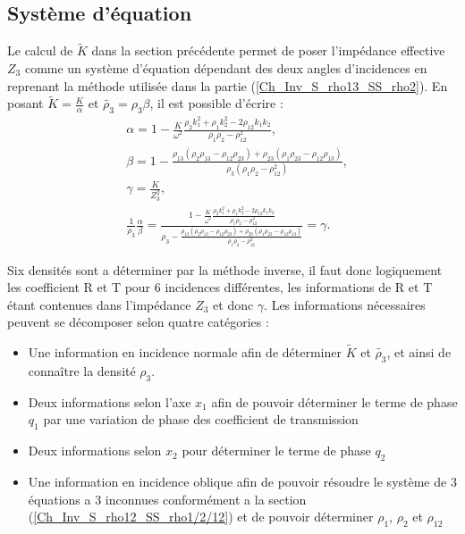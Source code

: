 \documentclass[12pt]{report}
\begin{document}
\subsection{Système d'équation}
	Le calcul de $\tilde{K}$ dans la section précédente permet de poser l'impédance effective $Z_3$ comme un système d'équation dépendant des deux angles d'incidences en reprenant la méthode utilisée dans la partie (\ref{Ch_Inv_S_rho13_SS_rho2}). En posant $\tilde{K}=\frac{K}{\alpha}$ et $\tilde{\rho_3}=\rho_3 \beta$, il est possible d'écrire :
    \begin{align}
    &\alpha=1-\frac{K}{\omega^2}\frac{\rho_2 k_1^2+\rho_1 k_2^2-2\rho_{12}k_1k_2}{\rho_1\rho_2-\rho_{12}^2},\nonumber \\
    &\beta=1-\frac{\rho_{13}(\rho_2\rho_{13}-\rho_{12}\rho_{23})+\rho_{23}(\rho_1\rho_{23}-\rho_{12}\rho_{13})}{\rho_3(\rho_1\rho_2-\rho_{12}^2)},\nonumber \\
    &\gamma=\frac{K}{Z_3^2},\nonumber \\
    &\frac{1}{\rho_3}\frac{\alpha}{\beta}=\frac{1-\frac{K}{\omega^2}\frac{\rho_2 k_1^2+\rho_1 k_2^2-2\rho_{12}k_1k_2}{\rho_1\rho_2-\rho_{12}^2}}{\rho_3-\frac{\rho_{13}(\rho_2\rho_{13}-\rho_{12}\rho_{23})+\rho_{23}(\rho_1\rho_{23}-\rho_{12}\rho_{13})}{\rho_1\rho_2-\rho_{12}^2}}=\gamma.\label{alpha_beta_complet}
    \end{align}
    
    Six densités sont a déterminer par la méthode inverse, il faut donc logiquement les coefficient R et T pour 6 incidences différentes, les informations de R et T étant contenues dans l'impédance $Z_3$ et donc $\gamma$. 
	Les informations nécessaires peuvent se décomposer selon quatre catégories :
    \begin{itemize}
    \item Une information en incidence normale afin de déterminer $\tilde{K}$ et $\tilde{\rho_3}$, et ainsi de connaître la densité $\rho_3$. 
    \item Deux informations selon l'axe $x_1$ afin de pouvoir déterminer le terme de phase $q_1$ par une variation de phase des coefficient de transmission
    \item Deux informations selon $x_2$ pour déterminer le terme de phase $q_2$
    \item Une information en incidence oblique afin de pouvoir résoudre le système de 3 équations a 3 inconnues conformément a la section (\ref{Ch_Inv_S_rho12_SS_rho1/2/12}) et de pouvoir déterminer $\rho_1$, $\rho_2$ et $\rho_{12}$ 
    \end{itemize}
    
\end{document}

